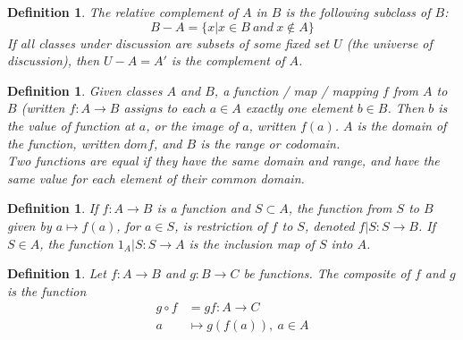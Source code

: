 \documentclass[a4paper,8pt]{article}
\newcommand{\hlt}[1]{\textit{{\color{blue}#1}}}
\theoremstyle{theorem}
\newtheorem{definition}[theorem]{Definition}
\begin{document}
\begin{definition}
The \hlt{relative complement} of $ A $ in $ B $ is the following subclass of $ B $: \\
\begin{equation}
B-A = \{ x | x \in B \ and \ x \notin A \} \nonumber
\end{equation}
If all classes under discussion are subsets of some fixed set $ U $ (the universe of discussion), then $ U - A = A' $ is the \hlt{complement} of $ A $.\\
\end{definition}


\begin{definition}
Given classes $ A $ and $ B $, a \hlt{function / map / mapping} $ f $ from $ A $ to $ B $ (written $ f: A \rightarrow B $ assigns to each $ a \in A $ exactly one element $ b \in B $.\newline
Then $ b $ is the value of function at $ a $, or the \hlt{image} of $ a $, written $ f(a) $.\newline
$ A $ is the \hlt{domain} of the function, written $ dom f $, and $ B $ is the \hlt{range} or \hlt{codomain}.\\
Two functions are \hlt{equal} if they have the same domain and range, and have the same value for each element of their common domain.\\
\end{definition}


\begin{definition}
If $ f: A \rightarrow B $ is a function and $ S \subset A$, the function from $ S $ to $ B $ given by $ a \mapsto f(a) $, for $ a \in S $, is \hlt{restriction} of $ f $ to $ S $, denoted $ f|S: S \rightarrow B$.\newline
If $ S \in A$, the function $ 1_A | S: S \rightarrow A $ is the \hlt{inclusion map} of $S$ into $A$.\\
\end{definition}


\begin{definition}
Let $ f: A \rightarrow B $ and $ g: B \rightarrow C $ be functions. The \hlt{composite} of $ f $ and $ g $ is the function
\begin{align}
g \circ f & = gf: A \rightarrow C \nonumber \\
a & \mapsto g(f(a)),\ a \in A \nonumber
\end{align}
\end{definition}
\end{document}
